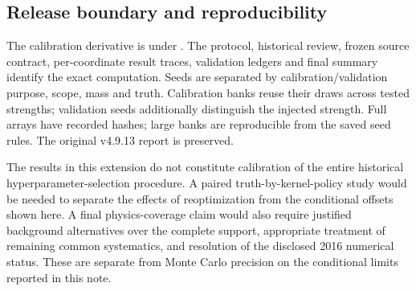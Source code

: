 \subsection{Release boundary and reproducibility}

The calibration derivative is under
. The protocol, historical
review, frozen source contract, per-coordinate result traces, validation
ledgers and final summary identify the exact computation. Seeds are
separated by calibration/validation purpose, scope, mass and truth.
Calibration banks reuse their draws across tested strengths; validation
seeds additionally distinguish the injected strength.
Full arrays have recorded hashes; large banks are reproducible
from the saved seed rules. The original v4.9.13 report is preserved.

The results in this extension do not constitute calibration of the entire
historical hyperparameter-selection procedure. A paired truth-by-kernel-policy
study would be needed to separate the effects of reoptimization from the
conditional offsets shown here. A final physics-coverage claim would also
require justified background alternatives over the complete support,
appropriate treatment of remaining common systematics, and resolution of
the disclosed 2016 numerical status. These are separate from Monte Carlo
precision on the conditional limits reported in this note.
